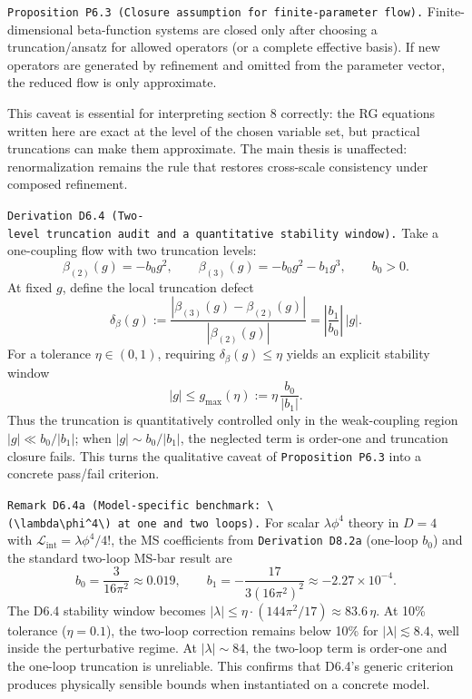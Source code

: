 \documentclass[
]{article}
\begin{document}
\texttt{Proposition\ P6.3\ (Closure\ assumption\ for\ finite-parameter\ flow).}
Finite-dimensional beta-function systems are closed only after choosing
a truncation/ansatz for allowed operators (or a complete effective
basis). If new operators are generated by refinement and omitted from
the parameter vector, the reduced flow is only approximate.

This caveat is essential for interpreting section 8 correctly: the RG
equations written here are exact at the level of the chosen variable
set, but practical truncations can make them approximate. The main
thesis is unaffected: renormalization remains the rule that restores
cross-scale consistency under composed refinement.

\texttt{Derivation\ D6.4\ (Two-level\ truncation\ audit\ and\ a\ quantitative\ stability\ window).}
Take a one-coupling flow with two truncation levels: \[
\beta_{(2)}(g)=-b_0 g^2,\qquad
\beta_{(3)}(g)=-b_0 g^2-b_1 g^3,\qquad b_0>0.
\] At fixed \(g\), define the local truncation defect \[
\delta_\beta(g):=\frac{|\beta_{(3)}(g)-\beta_{(2)}(g)|}{|\beta_{(2)}(g)|}
=\left|\frac{b_1}{b_0}\right|\,|g|.
\] For a tolerance \(\eta\in(0,1)\), requiring
\(\delta_\beta(g)\le \eta\) yields an explicit stability window \[
|g|\le g_{\max}(\eta):=\eta\,\frac{b_0}{|b_1|}.
\] Thus the truncation is quantitatively controlled only in the
weak-coupling region \(|g|\ll b_0/|b_1|\); when \(|g|\sim b_0/|b_1|\),
the neglected term is order-one and truncation closure fails. This turns
the qualitative caveat of \texttt{Proposition\ P6.3} into a concrete
pass/fail criterion.

\texttt{Remark\ D6.4a\ (Model-specific\ benchmark:\ \textbackslash{}(\textbackslash{}lambda\textbackslash{}phi\^{}4\textbackslash{})\ at\ one\ and\ two\ loops).}
For scalar \(\lambda\phi^4\) theory in \(D=4\) with
\(\mathcal{L}_{\mathrm{int}}=\lambda\phi^4/4!\), the MS coefficients
from \texttt{Derivation\ D8.2a} (one-loop \(b_0\)) and the standard
two-loop MS-bar result are \[
b_0=\frac{3}{16\pi^2}\approx 0.019,
\qquad
b_1=-\frac{17}{3(16\pi^2)^2}\approx -2.27\times 10^{-4}.
\] The D6.4 stability window becomes
\(|\lambda|\le\eta\cdot(144\pi^2/17)\approx 83.6\,\eta\). At 10\%
tolerance (\(\eta=0.1\)), the two-loop correction remains below 10\% for
\(|\lambda|\lesssim 8.4\), well inside the perturbative regime. At
\(|\lambda|\sim 84\), the two-loop term is order-one and the one-loop
truncation is unreliable. This confirms that D6.4's generic criterion
produces physically sensible bounds when instantiated on a concrete
model.
\end{document}
